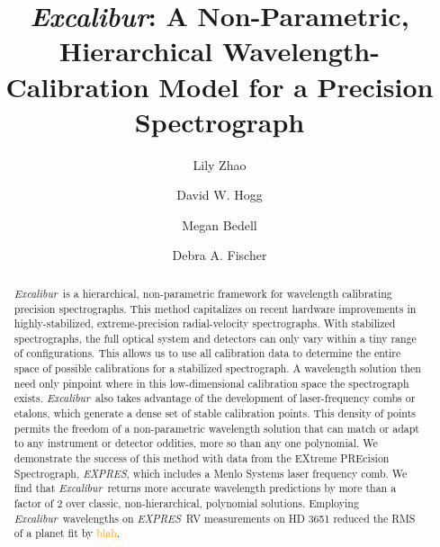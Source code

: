 \documentclass[12pt, onecolumn]{aastex63}
\newcommand{\lz}[1]{\textcolor{orange}{#1}}
\newcommand{\project}[1]{\textsl{#1}}
\newcommand{\name}{\project{Excalibur}}
\newcommand{\acronym}[1]{{\small{#1}}}
\newcommand{\expres}{\project{\acronym{EXPRES}}}
\begin{document}
\title{\name:
A Non-Parametric, Hierarchical Wavelength-Calibration Model for a Precision Spectrograph}


\author[0000-0002-3852-3590]{Lily Zhao}

\author[0000-0003-2866-9403]{David W. Hogg}

\author[0000-0001-9907-7742]{Megan Bedell}

\author[0000-0003-2221-0861]{Debra A. Fischer}

\begin{abstract}
\name\ is a hierarchical, non-parametric framework for wavelength calibrating precision spectrographs.  This method capitalizes on recent hardware improvements in highly-stabilized, extreme-precision radial-velocity spectrographs.  With stabilized spectrographs, the full optical system and detectors can only vary within a tiny range of configurations.  This allows us to use all calibration data to determine the entire space of possible calibrations for a stabilized spectrograph.  A wavelength solution then need only pinpoint where in this low-dimensional calibration space the spectrograph exists.  \name\ also takes advantage of the development of laser-frequency combs or etalons, which generate a dense set of stable calibration points.  This density of points permits the freedom of a non-parametric wavelength solution that can match or adapt to any instrument or detector oddities, more so than any one polynomial.  We demonstrate the success of this method with data from the EXtreme PREcision Spectrograph, \expres, which includes a Menlo Systems laser frequency comb.  We find that \name\ returns more accurate wavelength predictions by more than a factor of 2 over classic, non-hierarchical, polynomial solutions.  Employing \name\ wavelengths on \expres\ RV measurements on HD 3651 reduced the RMS of a planet fit by \lz{blah}.
\end{abstract}
\end{document}

